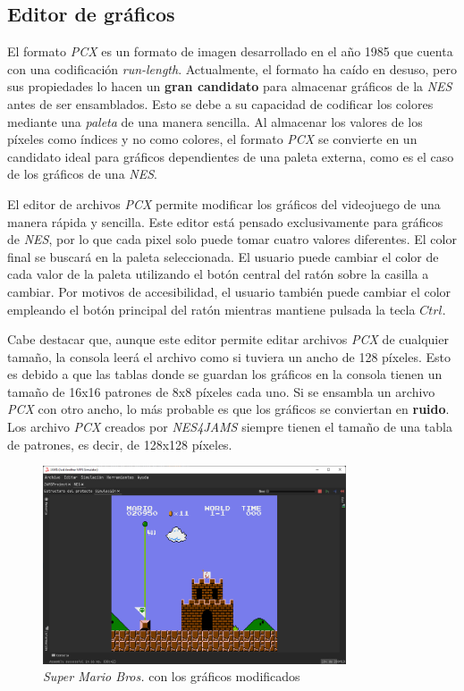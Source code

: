 \subsection{Editor de gráficos}\label{subsec:editor-de-graficos}

El formato \textit{PCX} es un formato de imagen desarrollado
en el año 1985 que cuenta con una codificación \textit{run-length}.
Actualmente, el formato ha caído en desuso, pero sus propiedades
lo hacen un \textbf{gran candidato} para almacenar gráficos
de la \textit{NES} antes de ser ensamblados.
Esto se debe a su capacidad de codificar los colores mediante
una \textit{paleta} de una manera sencilla.
Al almacenar los valores de los píxeles como índices y no
como colores, el formato \textit{PCX} se convierte en un
candidato ideal para gráficos dependientes de una paleta
externa, como es el caso de los gráficos de una \textit{NES}.

El editor de archivos \textit{PCX} permite modificar los
gráficos del videojuego de una manera rápida y sencilla.
Este editor está pensado exclusivamente para gráficos
de \textit{NES}, por lo que cada pixel solo puede tomar
cuatro valores diferentes.
El color final se buscará en la paleta seleccionada.
El usuario puede cambiar el color de cada valor de la
paleta utilizando el botón central del ratón sobre
la casilla a cambiar.
Por motivos de accesibilidad, el usuario también puede
cambiar el color empleando el botón principal del
ratón mientras mantiene pulsada la tecla $Ctrl$.

Cabe destacar que, aunque este editor permite editar
archivos \textit{PCX} de cualquier tamaño, la consola
leerá el archivo como si tuviera un ancho de 128 píxeles.
Esto es debido a que las tablas donde se guardan los gráficos
en la consola tienen un tamaño de 16x16 patrones
de 8x8 píxeles cada uno.
Si se ensambla un archivo \textit{PCX} con otro ancho,
lo más probable es que los gráficos se conviertan en
\textbf{ruido}.
Los archivo \textit{PCX} creados por \textit{NES4JAMS}
siempre tienen el tamaño de una tabla de patrones,
es decir, de 128x128 píxeles.

\begin{figure}[h]
    \centering
    \includegraphics[width=0.8\textwidth]{images/nes/nes-graphics-change}
    \caption{\textit{Super Mario Bros.} con los gráficos modificados}
    \label{fig:nes-graphics-change}
\end{figure}

